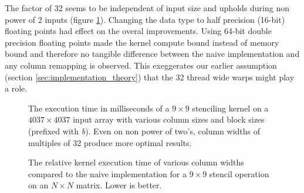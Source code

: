 The factor of 32 seems to be independent of input size and upholds during non power of 2 inputs (figure \ref{fig:cuda_kernel_time_stencil_no_pow2}).
Changing the data type to half precision (16-bit) floating points had effect on the overal improvements.
Using 64-bit double precision floating points made the kernel compute bound instead of memory bound and therefore no tangible difference between the naive implementation and any column remapping is observed.
This exeggerates our earlier assumption (section \ref{sec:implementation_theory}) that the 32 thread wide warps might play a role.

\begin{figure}
    \centering
    \caption{The execution time in milliseconds of a $9 \times 9$ stenciling kernel on a $4037 \times 4037$ input array with various column sizes and block sizes (prefixed with \textit{b}). Even on non power of two's, column widths of multiples of 32 produce more optimal results.}
    \label{fig:cuda_kernel_time_stencil_no_pow2}
\end{figure}

\begin{figure}
    \centering
    \caption{
        The relative kernel execution time of various column widths compared to the naive implementation for a $9 \times 9$ stencil operation on an $N \times N$ matrix. Lower is better.
    }
\end{figure}

